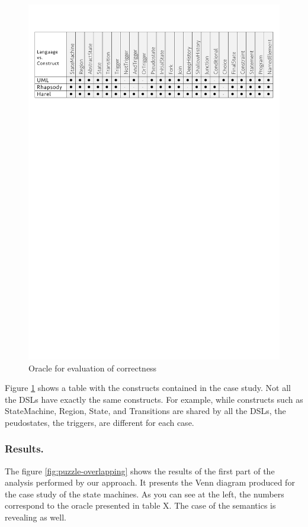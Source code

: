 \begin{figure}
\centering
\includegraphics[width=1\linewidth]{images/oracle.pdf}
\caption{Oracle for evaluation of correctness}
\label{fig:oracle}
\end{figure}

Figure \ref{fig:oracle} shows a table with the constructs contained in the case study. Not all the DSLs have exactly the same constructs. For example, while constructs such as StateMachine, Region, State, and Transitions are shared by all the DSLs, the peudostates, the triggers, are different for each case. 

\subsubsection{Results.} The figure \ref{fig:puzzle-overlapping} shows the results of the first part of the analysis performed by our approach. It presents the Venn diagram produced for the case study of the state machines. As you can see at the left, the numbers correspond to the oracle presented in table X. The case of the semantics is revealing as well. 

